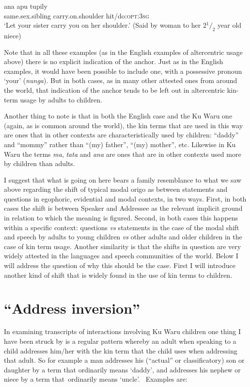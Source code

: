 \documentclass[output=paper]{langsci/langscibook}
\begin{document}
\begin{exe}
	\ex \label{ex:ar19}
	\gll ana apu tupily\\
	same.sex.sibling carry.on.shoulder hit/do:\textsc{opt}:3\textsc{sg}\\
	\trans ‘Let your sister carry you on her shoulder.’ (Said by woman to her 2$^1/_2$ year old niece)
\end{exe}

Note that in all these examples (as in the English examples of altercentric usage above) there is no explicit indication of the anchor. Just as in the English examples, it would have been possible to include one, with a possessive pronoun ‘your’ (\textit{nunga}). But in both cases, as in many other attested ones from around the world, that indication of the anchor tends to be left out in altercentric kin-term usage by adults to children. 	

Another thing to note is that in both the English case and the Ku Waru one (again, as is common around the world), the kin terms that are used in this way are ones that in other contexts are characteristically used by children: “daddy” and “mommy” rather than “(my) father”, “(my) mother”, etc. Likewise in Ku Waru the terms \textit{ma}, \textit{tata} and \textit{ana} are ones that are in other contexts used more by children than adults. 

I suggest that what is going on here bears a family resemblance to what we saw above regarding the shift of typical modal origo as between statements and questions in egophoric, evidential and modal contexts, in two ways. First, in both cases the shift is between Speaker and Addressee as the relevant implicit ground in relation to which the meaning is figured.  Second, in both cases this happens within a specific context: questions \textit{vs} statements in the case of the modal shift and speech by adults to young children \textit{vs} other adults and older children in the case of kin term usage. Another similarity is that the shifts in question are very widely attested in the languages and speech communities of the world. Below I will address the question of why this should be the case. First I will introduce another kind of shift that is widely found in the use of kin terms to children.

\section{“Address inversion”}\label{s:ar4}

In examining transcripts of interactions involving Ku Waru children one thing I have been struck by is a regular pattern whereby an adult when speaking to a child addresses him/her with the kin term that the child uses when addressing that adult. So for example a man addresses his (“actual” or classificatory) son or daughter by a term that ordinarily means ‘daddy’, and addresses his nephew or niece by a term that ordinarily means ‘uncle’.  Examples are:
\end{document}
